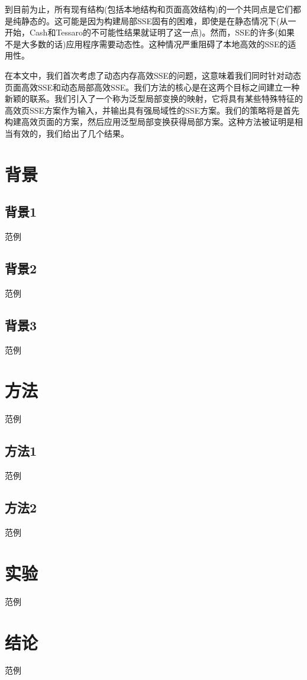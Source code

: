 \documentclass[UTF8]{article}
\begin{document}
到目前为止，所有现有结构(包括本地结构和页面高效结构)的一个共同点是它们都是纯静态的。这可能是因为构建局部SSE固有的困难，即使是在静态情况下(从一开始，Cash和Tessaro的不可能性结果就证明了这一点\cite{DavidCash2014TheLO})。然而，SSE的许多(如果不是大多数的话)应用程序需要动态性。这种情况严重阻碍了本地高效的SSE的适用性。

在本文中，我们首次考虑了动态内存高效SSE的问题，这意味着我们同时针对动态页面高效SSE和动态局部高效SSE。我们方法的核心是在这两个目标之间建立一种新颖的联系。我们引入了一个称为泛型局部变换的映射，它将具有某些特殊特征的高效页SSE方案作为输入，并输出具有强局域性的SSE方案。我们的策略将是首先构建高效页面的方案，然后应用泛型局部变换获得局部方案。这种方法被证明是相当有效的，我们给出了几个结果。
\section{背景}
\subsection{背景1}
范例

\subsection{背景2}
范例
\subsection{背景3}
范例

\section{方法}
范例
\subsection{方法1}
范例
\subsection{方法2}
范例
\section{实验}
范例
\section{结论}
范例


\end{document}
